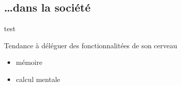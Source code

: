 \subsection{\ldots dans la société}

\begin{frame}{test}

Tendance à déléguer des fonctionnalitées de son cerveau 
\begin{itemize}
\item mémoire
\item calcul mentale
\end{itemize}

\end{frame}

